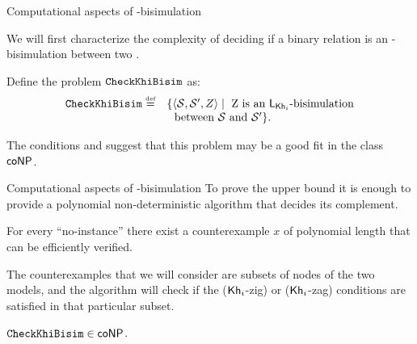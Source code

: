\documentclass{beamer}
\begin{document}

\begin{frame}{Computational aspects of \KHilogic-bisimulation}

    We will first characterize the complexity of deciding if a binary relation is an \KHilogic-bisimulation between two \ultss. \pause

    \begin{definition}
    \label{def:checkkhibisimpb}
        \begin{small}        
            Define the problem $\mathtt{CheckKhiBisim}$ as: 
            \[ 
            \begin{array}{ll}
            \checkkhibisimpb \eqdef &  \{\tup{\model,\model',Z} \mid \text{ Z is an $\KHilogic$-bisimulation} \\ 
            & \ \text{ between }  \model \text{ and } \model'\}.
            \end{array}
            \]
        \end{small}
    \end{definition} \pause

    The conditions  and  suggest that this problem may be a good fit in the class $\rm\textsf{coNP}$.

\end{frame}


\begin{frame}{Computational aspects of \KHilogic-bisimulation}
    To prove the upper bound it is enough to provide a polynomial non-deterministic algorithm that decides its complement. \pause
    
    For every ``no-instance'' there exist a counterexample $x$ of polynomial length that can be efficiently verified. \pause

    The counterexamples that we will consider are subsets of nodes of the two models, and the algorithm 
    will check if the (${\operatorname{\sf Kh}_i}$-zig) or (${\operatorname{\sf Kh}_i}$-zag) conditions are satisfied in that particular subset.\pause

    \begin{lemma}
        $\mathtt{CheckKhiBisim} \in \rm\textsf{coNP}$. 
    \end{lemma}
    
\end{frame}


\end{document}
